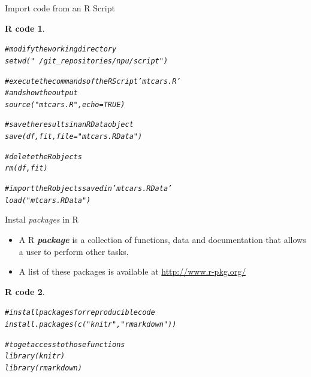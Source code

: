 \documentclass[11pt]{beamer}\usepackage[]{graphicx}\usepackage[]{color}
\makeatletter
\newcommand{\hlnum}[1]{\textcolor[rgb]{0.063,0.58,0.627}{#1}}%
\newcommand{\hlstr}[1]{\textcolor[rgb]{0.063,0.58,0.627}{#1}}%
\newcommand{\hlcom}[1]{\textcolor[rgb]{0.588,0.588,0.588}{#1}}%
\newcommand{\hlstd}[1]{\textcolor[rgb]{0.196,0.196,0.196}{#1}}%
\newcommand{\hlkwc}[1]{\textcolor[rgb]{0,0.631,0.314}{#1}}%
\newcommand{\hlkwd}[1]{\textcolor[rgb]{0.78,0.227,0.412}{#1}}%
\newenvironment{kframe}{%
 \def\at@end@of@kframe{}%
 \ifinner\ifhmode%
  \def\at@end@of@kframe{\end{minipage}}%
  \begin{minipage}{\columnwidth}%
 \fi\fi%
 \def\FrameCommand##1{\hskip\@totalleftmargin \hskip-\fboxsep
 \colorbox{shadecolor}{##1}\hskip-\fboxsep
     \hskip-\linewidth \hskip-\@totalleftmargin \hskip\columnwidth}%
 \MakeFramed {\advance\hsize-\width
   \@totalleftmargin\z@ \linewidth\hsize
   \@setminipage}}%
 {\par\unskip\endMakeFramed%
 \at@end@of@kframe}
\newenvironment{knitrout}{}{} %
\newtheorem{rcode}{R code}[section]
\makeatother
\begin{document}
\begin{frame}[fragile]{Import code from an R Script}

\begin{knitrout}\small
{}\color{fgcolor}\begin{kframe}
\begin{rcode}\label{unnamed-chunk-29}\begin{alltt}
\hlcom{# modify the working directory}
\hlkwd{setwd}\hlstd{(}\hlstr{"~/git_repositories/npu/script"}\hlstd{)}

\hlcom{# execute the commands of the RScript 'mtcars.R'}
\hlcom{# and show the output}
\hlkwd{source}\hlstd{(}\hlstr{"mtcars.R"}\hlstd{,} \hlkwc{echo} \hlstd{=} \hlnum{TRUE}\hlstd{)}

\hlcom{# save the results in an RData object}
\hlkwd{save}\hlstd{(df, fit,} \hlkwc{file} \hlstd{=} \hlstr{"mtcars.RData"}\hlstd{)}

\hlcom{# delete the R objects}
\hlkwd{rm}\hlstd{(df, fit)}

\hlcom{# import the R objects saved in 'mtcars.RData'}
\hlkwd{load}\hlstd{(}\hlstr{"mtcars.RData"}\hlstd{)}
\end{alltt}
\end{rcode}\end{kframe}
\end{knitrout}
\end{frame}




\begin{frame}[fragile]{Instal \textit{packages} in R}

\begin{itemize}
  \setlength\itemsep{1em}
\item A R \textit{\textbf{package}} is a collection of functions, data and documentation that allows a user to perform other tasks.
\item A list of these packages is available at \url{http://www.r-pkg.org/}
\end{itemize}
\pause
\begin{knitrout}
\color{fgcolor}\begin{kframe}
\begin{rcode}\label{unnamed-chunk-30}\begin{alltt}
\hlcom{# install packages for reproducible code}
\hlkwd{install.packages}\hlstd{(}\hlkwd{c}\hlstd{(}\hlstr{"knitr"}\hlstd{,}\hlstr{"rmarkdown"}\hlstd{))}

\hlcom{# to get access to those functions}
\hlkwd{library}\hlstd{(knitr)}
\hlkwd{library}\hlstd{(rmarkdown)}
\end{alltt}
\end{rcode}\end{kframe}
\end{knitrout}
\end{frame}
\end{document}
